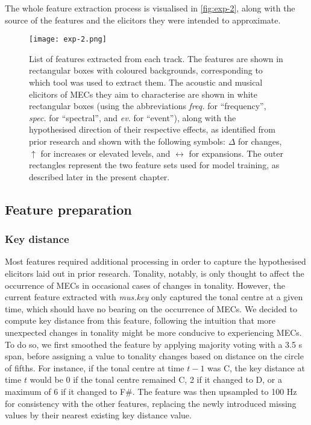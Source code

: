 The whole feature extraction process is visualised in \autoref{fig:exp-2}, along with the source of the features and the elicitors they were intended to approximate.

\begin{figure}[t!]
\texttt{[image: exp-2.png]}
\centering
\caption{List of features extracted from each track. The features are shown in rectangular boxes with coloured backgrounds, corresponding to which tool was used to extract them. The acoustic and musical elicitors of MECs they aim to characterise are shown in white rectangular boxes (using the abbreviations \emph{freq.} for ``frequency'', \emph{spec.} for ``spectral'', and \emph{ev.} for ``event''), along with the hypothesised direction of their respective effects, as identified from prior research and shown with the following symbols: $\Delta$ for changes, $\uparrow$ for increases or elevated levels, and $\leftrightarrow$ for expansions. The outer rectangles represent the two feature sets used for model training, as described later in the present chapter.}
\label{fig:exp-2}
\end{figure}

\subsection{Feature preparation}

\subsubsection{Key distance}

Most features required additional processing in order to capture the hypothesised elicitors laid out in prior research. Tonality, notably, is only thought to affect the occurrence of MECs in occasional cases of changes in tonality. However, the current feature extracted with \emph{mus.key} only captured the tonal centre at a given time, which should have no bearing on the occurrence of MECs. We decided to compute key distance from this feature, following the intuition that more unexpected changes in tonality might be more conducive to experiencing MECs. To do so, we first smoothed the feature by applying majority voting with a 3.5 s span, before assigning a value to tonality changes based on distance on the circle of fifths. For instance, if the tonal centre at time $t - 1$ was C, the key distance at time $t$ would be 0 if the tonal centre remained C, 2 if it changed to D, or a maximum of 6 if it changed to F\#. The feature was then upsampled to 100 Hz for consistency with the other features, replacing the newly introduced missing values by their nearest existing key distance value.

